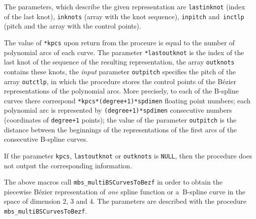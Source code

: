 The parameters, which describe the given representation are
\texttt{lastinknot} (index of the last knot), \texttt{inknots}
(array with the knot sequence),
\texttt{inpitch} and~\texttt{inctlp} (pitch and the array with the control
points).

The value of \texttt{*kpcs} upon return from the proceure is equal to
the number of polynomial arcs of each curve.
The parameter \texttt{*lastoutknot} is the index of the last knot
of the sequence of the resulting representation, the array
\texttt{outknots} contains these knots, the \emph{input} parameter
\texttt{outpitch} specifies the pitch of the array \texttt{outctlp},
in which the procedure stores the control points of the B\'{e}zier
representations of the polynomial arcs.
More precisely, to each of the B-spline curves there correspond
\texttt{*kpcs*(degree+1)*spdimen} floating point numbers; each polynomial
arc is represented by \texttt{(degree+1)*spdimen} consecutive numbers
(coordinates of \texttt{degree+1} points); the value of the parameter
\texttt{outpitch} is the distance between the beginnings of
the representations of the first arcs of the consecutive B-spline curves.

If the parameter \texttt{kpcs}, \texttt{lastoutknot} or \texttt{outknots}
is \texttt{NULL}, then the procedure does not output the corresponding
information.


\vspace{\bigskipamount}
\begin{sloppypar}
The above macros call \texttt{mbs\_multiBSCurvesToBezf} in order to
obtain the piecewise B\'{e}zier representation of \emph{one} spline function or
a~B-spline curve in the space of dimension $2$, $3$ and $4$. The
parameters are described with the procedure
\texttt{mbs\_multiBSCurvesToBezf}.
\end{sloppypar}


